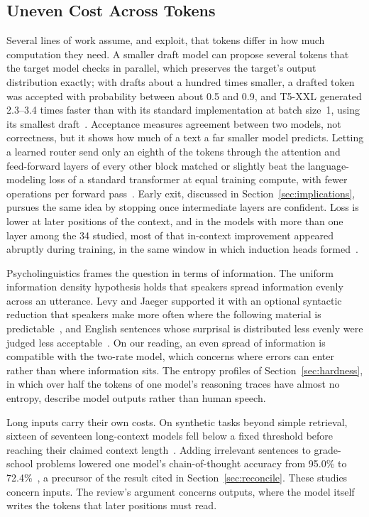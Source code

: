 \documentclass{ieeeaccess}
\begin{document}
\subsection{Uneven Cost Across Tokens}
Several lines of work assume, and exploit, that tokens differ in how much computation they need. A smaller draft model can propose several tokens that the target model checks in parallel, which preserves the target's output distribution exactly; with drafts about a hundred times smaller, a drafted token was accepted with probability between about 0.5 and 0.9, and T5-XXL generated 2.3--3.4 times faster than with its standard implementation at batch size~1, using its smallest draft~\cite{leviathan2023fast}. Acceptance measures agreement between two models, not correctness, but it shows how much of a text a far smaller model predicts. Letting a learned router send only an eighth of the tokens through the attention and feed-forward layers of every other block matched or slightly beat the language-modeling loss of a standard transformer at equal training compute, with fewer operations per forward pass~\cite{raposo2024mixture}. Early exit, discussed in Section~\ref{sec:implications}, pursues the same idea by stopping once intermediate layers are confident. Loss is lower at later positions of the context, and in the models with more than one layer among the 34 studied, most of that in-context improvement appeared abruptly during training, in the same window in which induction heads formed~\cite{olsson2022induction}.

Psycholinguistics frames the question in terms of information. The uniform information density hypothesis holds that speakers spread information evenly across an utterance. Levy and Jaeger supported it with an optional syntactic reduction that speakers make more often where the following material is predictable~\cite{levy2007speakers}, and English sentences whose surprisal is distributed less evenly were judged less acceptable~\cite{meister2021revisiting}. On our reading, an even spread of information is compatible with the two-rate model, which concerns where errors can enter rather than where information sits. The entropy profiles of Section~\ref{sec:hardness}, in which over half the tokens of one model's reasoning traces have almost no entropy, describe model outputs rather than human speech.

Long inputs carry their own costs. On synthetic tasks beyond simple retrieval, sixteen of seventeen long-context models fell below a fixed threshold before reaching their claimed context length~\cite{hsieh2024ruler}. Adding irrelevant sentences to grade-school problems lowered one model's chain-of-thought accuracy from 95.0\% to 72.4\%~\cite{shi2023distracted}, a precursor of the result cited in Section~\ref{sec:reconcile}. These studies concern inputs. The review's argument concerns outputs, where the model itself writes the tokens that later positions must read.
\end{document}

